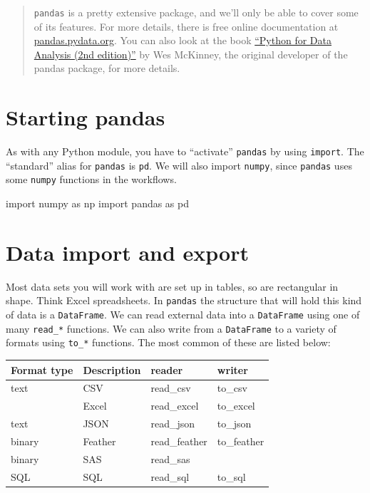 \documentclass[
  letterpaper,
]{scrbook}
\newenvironment{Shaded}{\begin{snugshade}}{\end{snugshade}}
\newcommand{\ImportTok}[1]{#1}
\newcommand{\NormalTok}[1]{#1}
\begin{document}
\begin{quote}
\texttt{pandas} is a pretty extensive package, and we'll only be able to cover some of its features. For more details, there is free online documentation at \href{https://pandas.pydata.org}{pandas.pydata.org}. You can also look at the book \href{https://www.amazon.com/Python-Data-Analysis-Wrangling-IPython-dp-1491957662/dp/1491957662/}{``Python for Data Analysis (2nd edition)''} by Wes McKinney, the original developer of the pandas package, for more details.
\end{quote}

\hypertarget{starting-pandas}{%
\section{Starting pandas}\label{starting-pandas}}

As with any Python module, you have to ``activate'' \texttt{pandas} by using \texttt{import}. The ``standard'' alias for \texttt{pandas} is \texttt{pd}. We will also import \texttt{numpy}, since \texttt{pandas} uses some \texttt{numpy} functions in the workflows.

\begin{Shaded}
\begin{Highlighting}[]
\ImportTok{import}\NormalTok{ numpy }\ImportTok{as}\NormalTok{ np}
\ImportTok{import}\NormalTok{ pandas }\ImportTok{as}\NormalTok{ pd}
\end{Highlighting}
\end{Shaded}

\hypertarget{data-import-and-export}{%
\section{Data import and export}\label{data-import-and-export}}

Most data sets you will work with are set up in tables, so are rectangular in shape. Think Excel spreadsheets. In \texttt{pandas} the structure that will hold this kind of data is a \texttt{DataFrame}. We can read external data into a \texttt{DataFrame} using one of many \texttt{read\_*} functions. We can also write from a \texttt{DataFrame} to a variety of formats using \texttt{to\_*} functions. The most common of these are listed below:

\begin{longtable}[]{@{}llll@{}}
\toprule
Format type & Description & reader & writer\tabularnewline
\midrule
\endhead
text & CSV & read\_csv & to\_csv\tabularnewline
& Excel & read\_excel & to\_excel\tabularnewline
text & JSON & read\_json & to\_json\tabularnewline
binary & Feather & read\_feather & to\_feather\tabularnewline
binary & SAS & read\_sas &\tabularnewline
SQL & SQL & read\_sql & to\_sql\tabularnewline
\bottomrule
\end{longtable}
\end{document}
